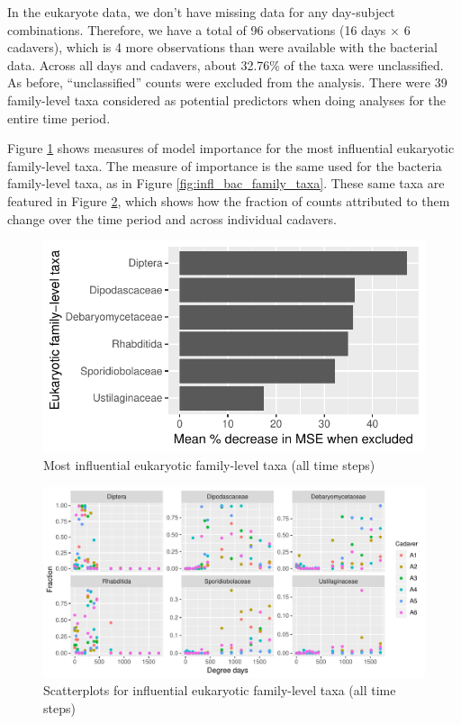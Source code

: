\documentclass{article}
\begin{document}
In the eukaryote data, we don't have missing data for any day-subject
combinations.  Therefore, we have a total of 96 observations (16 days
$\times$ 6 cadavers), which is 4 more observations than were available
with the bacterial data.  Across all days and cadavers, about 32.76\%
of the taxa were unclassified.  As before, ``unclassified'' counts
were excluded from the analysis.  There were 39 family-level taxa
considered as potential predictors when doing analyses for the entire
time period.

Figure \ref{fig:infl_euk_family_taxa} shows measures of model
importance for the most influential eukaryotic family-level taxa.  The
measure of importance is the same used for the bacteria family-level
taxa, as in Figure \ref{fig:infl_bac_family_taxa}.  These same taxa
are featured in Figure \ref{fig:infl_euk_family_all_data_scatter},
which shows how the fraction of counts attributed to them change over
the time period and across individual cadavers.
\begin{figure}
  \centering
  \includegraphics{../eukaryote_data/only_families/all_time_steps/hit_1perc_twice/orig_units_all_data_families_PercIncMSE_barchart}
  \caption{Most influential eukaryotic family-level taxa (all time steps)}
  \label{fig:infl_euk_family_taxa}
\end{figure}

\begin{figure}
  \centering
  \includegraphics[width=7.5in]{../eukaryote_data/only_families/all_time_steps/hit_1perc_twice/infl_euk_family_all_data_scatter}
  \caption{Scatterplots for influential eukaryotic family-level taxa (all time steps)}
  \label{fig:infl_euk_family_all_data_scatter}
\end{figure}
\end{document}
